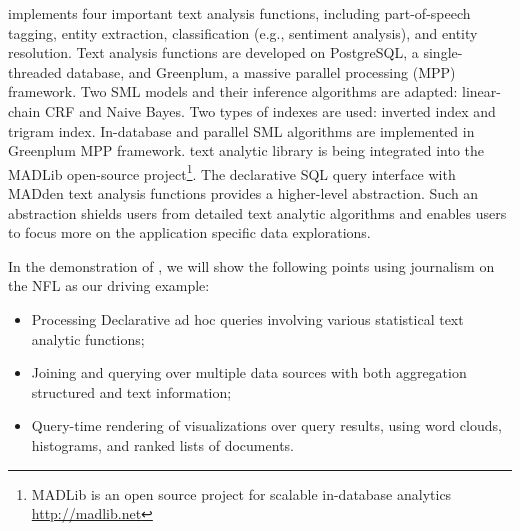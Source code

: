 {\system} implements four important text analysis functions,  
including part-of-speech tagging, entity extraction, classification 
(e.g., sentiment analysis), and entity resolution.
Text analysis functions are developed on PostgreSQL, 
a single-threaded database, and Greenplum, a massive parallel 
processing (MPP) framework. 
Two SML models and their inference algorithms are adapted: linear-chain 
CRF and Naive Bayes\cite{Wang:2008:BML:1453856.1453896}. 
Two types of indexes are used: inverted index and trigram index. 
In-database and parallel SML algorithms are implemented in Greenplum MPP framework.
{\system} text analytic library is being integrated into the MADLib
open-source project\footnote{MADLib is an open source project for scalable in-database 
analytics \url{http://madlib.net}}.
The declarative SQL query interface with MADden text analysis functions 
provides a higher-level abstraction. Such an abstraction shields users from 
detailed text analytic algorithms and enables users to focus more on the 
application specific data explorations. 



In the demonstration of \system, we will show the 
following points using journalism on the NFL as our driving example:
\begin{itemize}[noitemsep]
\item Processing Declarative ad hoc queries involving various statistical text analytic functions;
\item Joining and querying over multiple data sources with both aggregation structured and text information;
\item Query-time rendering of visualizations over query results, using 
word clouds, histograms, and ranked lists of documents.
\end{itemize}

